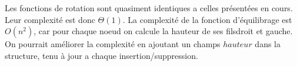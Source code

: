 \documentclass[10pt]{report}
\begin{document}
Les fonctions de rotation sont quasiment identiques a celles présentées en cours. Leur complexité est donc $\Theta(1)$. La complexité de la fonction d'équilibrage est $O(n^2)$, car pour chaque noeud on calcule la hauteur de ses filsdroit et gauche. On pourrait améliorer la complexité en ajoutant un champs $hauteur$ dans la structure, tenu à jour a chaque insertion/suppression.
\end{document}
